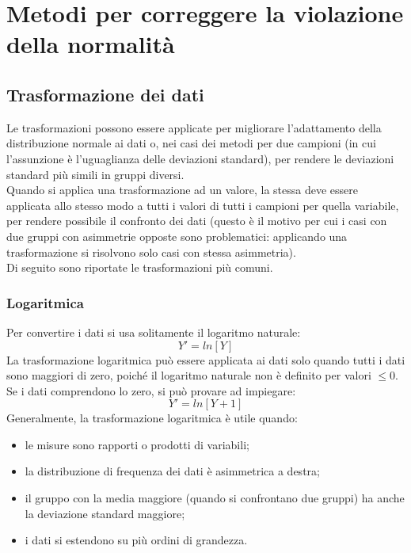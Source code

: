 \documentclass[10pt, draft]{book}
\newcommand{\tightlist}{%
\setlength{\itemsep}{1pt}\setlength{\parskip}{0pt}\setlength{\parsep}{0pt}}
\begin{document}
\section{Metodi per correggere la violazione della normalità}

\subsection{Trasformazione dei dati}\label{trasformazioni}

Le trasformazioni possono essere applicate per migliorare l'adattamento  della distribuzione normale ai dati o, nei casi dei metodi per due campioni (in cui l'assunzione è l'uguaglianza delle deviazioni standard), per rendere le deviazioni standard più simili in gruppi diversi.\\
Quando si applica una trasformazione ad un valore, la stessa deve essere applicata allo stesso modo a tutti i valori di tutti i campioni per quella variabile, per rendere possibile il confronto dei dati (questo è il motivo per cui i casi con due gruppi con asimmetrie opposte sono problematici: applicando una trasformazione si risolvono solo casi con stessa asimmetria).\\
Di seguito sono riportate le trasformazioni più comuni.

\subsubsection{Logaritmica}

Per convertire i dati si usa solitamente il logaritmo naturale:
\begin{equation}
    Y'= ln[Y]
\end{equation}
La trasformazione logaritmica può essere applicata ai dati solo quando tutti i dati sono maggiori di zero, poiché il logaritmo naturale non è definito per valori $\leq 0$. Se i dati comprendono lo zero, si può provare ad impiegare:
\begin{equation}
    Y'= ln[Y+1]
\end{equation}
Generalmente, la trasformazione logaritmica è utile quando:
\begin{itemize} \tightlist
    \item le misure sono rapporti o prodotti di variabili;
    \item la distribuzione di frequenza dei dati è asimmetrica a destra;
    \item il gruppo con la media maggiore (quando si confrontano due gruppi) ha anche la deviazione standard maggiore;
    \item i dati si estendono su più ordini di grandezza.
\end{itemize}
\end{document}
